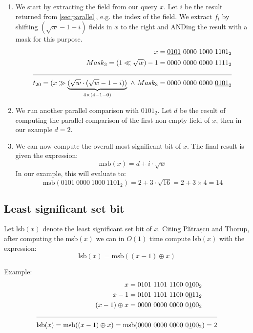 \begin{enumerate}
    \item
    We start by extracting the field from our query $x$. Let $i$ be the result returned from \ref{sec:parallel}, e.g. the index of the field. We extract $f_i$ by shifting $(\sqrt{w} - 1 - i)$ fields in $x$ to the right and ANDing the result with a mask for this purpose.
    \begin{align*}
        x = \underline{0101}\ 0000\ 1000\ 1101_2 &\\
        Mask_3 = (1 \ll \sqrt{w}) - 1 = 0000\ 0000\ 0000\ 1111_2 &\\
        \cline{1-2}
        t_{20} = (x \gg \underbrace{(\sqrt{w} \cdot (\sqrt{w} - 1 - i))}_{4\times(4-1-0)}\ \wedge\ Mask_3 = 0000\ 0000\ 0000\ \underline{0101}_2 &
    \end{align*}
    \item
    We run another parallel comparison with $0101_2$. Let $d$ be the result of computing the parallel comparison of the first non-empty field of $x$, then in our example $d = 2$.
    \item
    We can now compute the overall most significant bit of $x$. The final result is given the expression:
    \begin{equation*}
        \text{msb}(x) = d + i\cdot\sqrt{w}
    \end{equation*}
    In our example, this will evaluate to:
    \begin{equation*}
        \text{msb}(0101\ 0000\ 1000\ 1101_2) = 2 + 3\cdot\sqrt{16} = 2 + 3 \times 4 = 14
    \end{equation*}
\end{enumerate}

\subsection{Least significant set bit} \label{sec:lsbAlgorithm}

Let lsb$(x)$ denote the least significant set bit of $x$. Citing Pătrașcu and Thorup, after computing the msb$(x)$ we can in $O(1)$ time compute lsb$(x)$ with the expression:
\begin{equation*}
    \text{lsb}(x) = \text{msb}((x - 1) \oplus x)
\end{equation*}

Example:
\begin{align*}
    x = 0101\ 1101\ 1100\ 0\underline{1}00_2& \\
    x - 1 = 0101\ 1101\ 1100\ 0\underline{0}11_2& \\
    (x - 1) \oplus x = 0000\ 0000\ 0000\ 0\underline{1}00_2& \\
    \cline{1-2}
    \text{lsb}(x) = \text{msb}((x - 1) \oplus x) = \text{msb}(0000\ 0000\ 0000\ 0\underline{1}00_2&) = 2
\end{align*}


